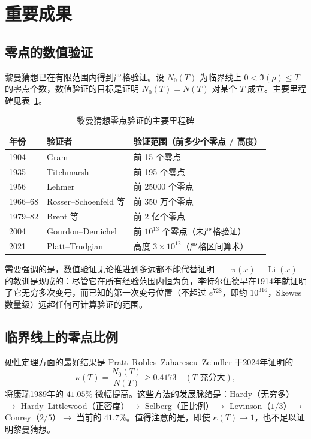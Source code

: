 \section{重要成果}\label{sec:results}

\subsection{零点的数值验证}

黎曼猜想已在有限范围内得到严格验证。设 $N_0(T)$ 为临界线上 $0 < \Im(\rho) \le T$ 的零点个数，数值验证的目标是证明 $N_0(T) = N(T)$ 对某个 $T$ 成立。主要里程碑见表~\ref{tab:verification}。

\begin{table}[htbp]
    \centering
    \caption{黎曼猜想零点验证的主要里程碑}
    \label{tab:verification}
    \begin{tabular}{lll}
        \toprule
        年份 & 验证者 & 验证范围（前多少个零点 / 高度） \\
        \midrule
        1904 & Gram & 前 15 个零点 \\
        1935 & Titchmarsh & 前 195 个零点 \\
        1956 & Lehmer & 前 25000 个零点 \\
        1966--68 & Rosser--Schoenfeld 等 & 前 350 万个零点 \\
        1979--82 & Brent 等 & 前 2 亿个零点 \\
        2004 & Gourdon--Demichel & 前 $10^{13}$ 个零点（未严格验证） \\
        2021 & Platt--Trudgian & 高度 $3\times 10^{12}$（严格区间算术） \\
        \bottomrule
    \end{tabular}
\end{table}

需要强调的是，数值验证无论推进到多远都不能代替证明——$\pi(x) - \operatorname{Li}(x)$ 的教训是现成的：尽管它在所有经验范围内恒为负，李特尔伍德早在1914年就证明了它无穷多次变号，而已知的第一次变号位置（不超过 $e^{728}$，即约 $10^{316}$，Skewes 数量级）远超任何可计算验证的范围。

\subsection{临界线上的零点比例}

硬性定理方面的最好结果是 Pratt--Robles--Zaharescu--Zeindler 于2024年证明的\cite{pratt2024zeros}
\begin{equation}
    \kappa(T) = \frac{N_0(T)}{N(T)} \ge 0.4173 \quad (T \text{ 充分大}),
\end{equation}
将康瑞1989年的 $41.05\%$ \cite{conrey1989zeros} 微幅提高。这些方法的发展脉络是：Hardy（无穷多）$\to$ Hardy--Littlewood（正密度）$\to$ Selberg（正比例）$\to$ Levinson（$1/3$）$\to$ Conrey（$2/5$）$\to$ 当前的 $41.7\%$。值得注意的是，即使 $\kappa(T) \to 1$，也不足以证明黎曼猜想。

